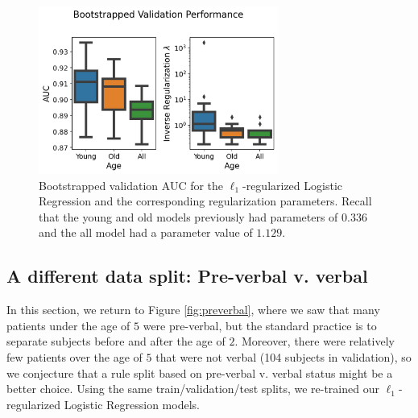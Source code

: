 \documentclass[11pt, letterpaper]{amsart}
\let\Oldsubsection\subsection
\renewcommand{\subsection}{\FloatBarrier\Oldsubsection}
\begin{document}
\begin{figure}
	\centering
	\includegraphics[width=0.7\textwidth]{lr_bootstrap_val.png}
	\caption{Bootstrapped validation AUC for the $\ell_1$-regularized Logistic Regression and the corresponding regularization parameters. Recall that the young and old models previously had parameters of $0.336$ and the all model had a parameter value of $1.129$.}\label{fig:lr_bootstrap_val}
\end{figure}

\subsection{A different data split: Pre-verbal v. verbal} \label{ssec:verbal}

In this section, we return to Figure \ref{fig:preverbal}, where we saw that many patients under the age of $5$ were pre-verbal, but the standard practice is to separate subjects before and after the age of $2$. Moreover, there were relatively few patients over the age of $5$ that were not verbal (104 subjects in validation), so we conjecture that a rule split based on pre-verbal v. verbal status might be a better choice. Using the same train/validation/test splits, we re-trained our $\ell_1$-regularized Logistic Regression models. 
\end{document}
